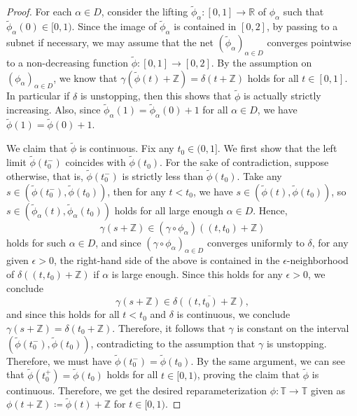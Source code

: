 \documentclass[reqno,centertags,12pt]{amsart}
\theoremstyle{definition}
\numberwithin{equation}{section}
\newcommand{\seq}[1]{\left( #1 \right)}
\newcommand{\bbR}{{\mathbb{R}}}
\newcommand{\bbZ}{{\mathbb{Z}}}
\newcommand{\bbT}{{\mathbb{T}}}
\begin{document}
\begin{proof}
	For each $\alpha\in D$, consider the lifting $\tilde{\phi}_{\alpha}\colon[0,1]\to\bbR$
	of $\phi_{\alpha}$ such that $\tilde{\phi}_{\alpha}(0) \in [0,1)$. Since the image of
	$\tilde{\phi}_{\alpha}$ is contained in $[0,2]$, by passing to a subnet if necessary,
	we may assume that the net $\seq{\tilde{\phi}_{\alpha}}_{\alpha\in D}$
	converges pointwise to a non-decreasing function $\tilde{\phi}\colon[0,1]\to[0,2]$.
	By the assumption on $\seq{\phi_{\alpha}}_{\alpha\in D}$, we know that
	$\gamma(\tilde{\phi}(t)+\bbZ) = \delta(t+\bbZ)$ holds for all $t\in[0,1]$.
    In particular if $\delta$ is unstopping, then this shows that $\tilde{\phi}$ is
    actually strictly increasing. Also, since
    $\tilde{\phi}_{\alpha}(1) = \tilde{\phi}_{\alpha}(0) + 1$
	for all $\alpha\in D$, we have $\tilde{\phi}(1) = \tilde{\phi}(0) + 1$.
	
	We claim that $\tilde{\phi}$ is continuous. Fix any $t_{0}\in(0,1]$.
	We first show that the left limit $\tilde{\phi}(t_{0}^{-})$ coincides with
	$\tilde{\phi}(t_{0})$. For the sake of contradiction, suppose otherwise, that is,
	$\tilde{\phi}(t_{0}^{-})$ is strictly less than $\tilde{\phi}(t_{0})$.
	Take any $s\in\left(\tilde{\phi}(t_{0}^{-}),\tilde{\phi}(t_{0})\right)$, then
	for any $t<t_{0}$, we have $s\in\left(\tilde{\phi}(t),\tilde{\phi}(t_{0})\right)$,
	so $s\in\left(\tilde{\phi}_{\alpha}(t),\tilde{\phi}_{\alpha}(t_{0})\right)$
	holds for all large enough $\alpha\in D$. Hence,
	\[
		\gamma(s+\bbZ) \in (\gamma\circ\phi_{\alpha})\left((t,t_{0})+\bbZ\right)
	\]
	holds for such $\alpha\in D$, and since $\seq{\gamma\circ\phi_{\alpha}}_{\alpha\in D}$
	converges uniformly to $\delta$, for any given $\epsilon>0$,
	the right-hand side of the above is contained in the $\epsilon$-neighborhood of
	$\delta\left((t,t_{0})+\bbZ\right)$ if $\alpha$ is large enough.
	Since this holds for any $\epsilon>0$, we conclude
	\[
		\gamma(s+\bbZ) \in \overline{\delta\left((t,t_{0})+\bbZ\right)},
	\]
	and since this holds for all $t<t_{0}$ and $\delta$ is continuous,
	we conclude $\gamma(s+\bbZ) = \delta(t_{0}+\bbZ)$. Therefore, it follows that $\gamma$
	is constant on the interval $\left(\tilde{\phi}(t_{0}^{-}),\tilde{\phi}(t_{0})\right)$,
	contradicting to the assumption that $\gamma$ is unstopping. Therefore, we must have
	$\tilde{\phi}(t_{0}^{-}) = \tilde{\phi}(t_{0})$. By the same argument,
	we can see that $\tilde{\phi}(t_{0}^{+}) = \tilde{\phi}(t_{0})$ holds for all
	$t\in[0,1)$, proving the claim that $\tilde{\phi}$ is continuous.
	Therefore, we get the desired reparameterization $\phi\colon\bbT\to\bbT$ given as
	$\phi(t+\bbZ)\coloneqq\tilde{\phi}(t) + \bbZ$ for $t\in[0,1)$.
\end{proof}
\end{document}
